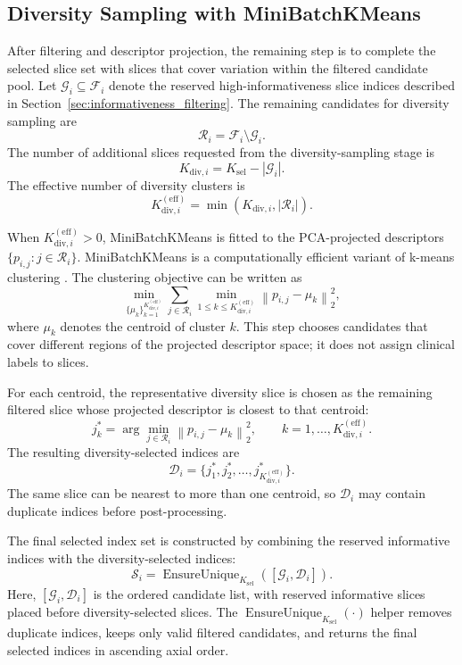 \subsection{Diversity Sampling with MiniBatchKMeans}
\label{sec:diversity_sampling_minibatchkmeans}

After filtering and descriptor projection, the remaining step is to complete the selected slice set with slices that cover variation within the filtered candidate pool. Let \(\mathcal{G}_i \subseteq \mathcal{F}_i\) denote the reserved high-informativeness slice indices described in Section~\ref{sec:informativeness_filtering}. The remaining candidates for diversity sampling are
\[
\mathcal{R}_i
=
\mathcal{F}_i \setminus \mathcal{G}_i.
\]
The number of additional slices requested from the diversity-sampling stage is
\[
K_{\mathrm{div},i}
=
K_{\mathrm{sel}} - |\mathcal{G}_i|.
\]
The effective number of diversity clusters is
\[
K^{(\mathrm{eff})}_{\mathrm{div},i}
=
\min\!\left(K_{\mathrm{div},i}, |\mathcal{R}_i|\right).
\]

When \(K^{(\mathrm{eff})}_{\mathrm{div},i} > 0\), MiniBatchKMeans is fitted to the PCA-projected descriptors \(\{p_{i,j}: j \in \mathcal{R}_i\}\). MiniBatchKMeans is a computationally efficient variant of k-means clustering \cite{sculley2010minibatch}. The clustering objective can be written as
\[
\min_{\{\mu_k\}_{k=1}^{K^{(\mathrm{eff})}_{\mathrm{div},i}}}
\sum_{j \in \mathcal{R}_i}
\min_{1 \leq k \leq K^{(\mathrm{eff})}_{\mathrm{div},i}}
\left\|p_{i,j} - \mu_k\right\|_2^2,
\]
where \(\mu_k\) denotes the centroid of cluster \(k\). This step chooses candidates that cover different regions of the projected descriptor space; it does not assign clinical labels to slices.

For each centroid, the representative diversity slice is chosen as the remaining filtered slice whose projected descriptor is closest to that centroid:
\[
j_k^{*}
=
\arg\min_{j \in \mathcal{R}_i}
\left\|p_{i,j} - \mu_k\right\|_2^2,
\qquad
k = 1,\dots,K^{(\mathrm{eff})}_{\mathrm{div},i}.
\]
The resulting diversity-selected indices are
\[
\mathcal{D}_i
=
\{j_1^{*}, j_2^{*}, \dots, j_{K^{(\mathrm{eff})}_{\mathrm{div},i}}^{*}\}.
\]
The same slice can be nearest to more than one centroid, so \(\mathcal{D}_i\) may contain duplicate indices before post-processing.

The final selected index set is constructed by combining the reserved informative indices with the diversity-selected indices:
\[
\mathcal{S}_i
=
\operatorname{EnsureUnique}_{K_{\mathrm{sel}}}
\left(
[\mathcal{G}_i,\mathcal{D}_i]
\right).
\]
Here, \([\mathcal{G}_i,\mathcal{D}_i]\) is the ordered candidate list, with reserved informative slices placed before diversity-selected slices. The \(\operatorname{EnsureUnique}_{K_{\mathrm{sel}}}(\cdot)\) helper removes duplicate indices, keeps only valid filtered candidates, and returns the final selected indices in ascending axial order.

